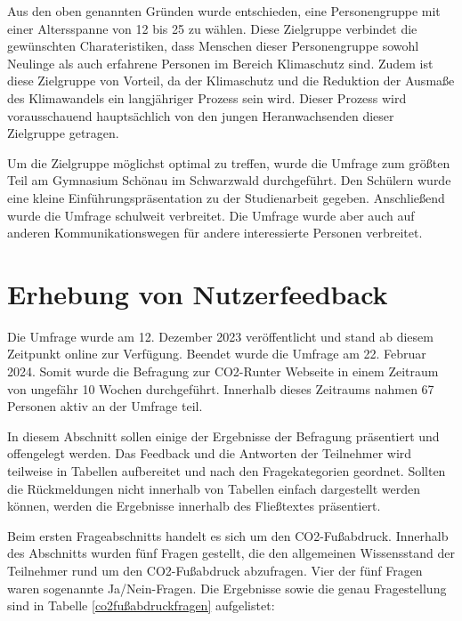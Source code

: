 Aus den oben genannten Gründen wurde entschieden, eine Personengruppe mit einer Altersspanne von 12 bis 25 zu wählen.
Diese Zielgruppe verbindet die gewünschten Charateristiken, dass Menschen dieser Personengruppe sowohl Neulinge als auch erfahrene Personen im Bereich Klimaschutz sind.
Zudem ist diese Zielgruppe von Vorteil, da der Klimaschutz und die Reduktion der Ausmaße des Klimawandels ein langjähriger Prozess sein wird.
Dieser Prozess wird vorausschauend hauptsächlich von den jungen Heranwachsenden dieser Zielgruppe getragen.

Um die Zielgruppe möglichst optimal zu treffen, wurde die Umfrage zum größten Teil am Gymnasium Schönau im Schwarzwald durchgeführt.
Den Schülern wurde eine kleine Einführungspräsentation zu der Studienarbeit gegeben.
Anschließend wurde die Umfrage schulweit verbreitet.
Die Umfrage wurde aber auch auf anderen Kommunikationswegen für andere interessierte Personen verbreitet.

\section{Erhebung von Nutzerfeedback}
Die Umfrage wurde am 12. Dezember 2023 veröffentlicht und stand ab diesem Zeitpunkt online zur Verfügung.
Beendet wurde die Umfrage am 22. Februar 2024.
Somit wurde die Befragung zur CO2-Runter Webseite in einem Zeitraum von ungefähr 10 Wochen durchgeführt.
Innerhalb dieses Zeitraums nahmen 67 Personen aktiv an der Umfrage teil.

In diesem Abschnitt sollen einige der Ergebnisse der Befragung präsentiert und offengelegt werden.
Das Feedback und die Antworten der Teilnehmer wird teilweise in Tabellen aufbereitet und nach den Fragekategorien geordnet.
Sollten die Rückmeldungen nicht innerhalb von Tabellen einfach dargestellt werden können, werden die Ergebnisse innerhalb des Fließtextes präsentiert.

Beim ersten Frageabschnitts handelt es sich um den CO2-Fußabdruck.
Innerhalb des Abschnitts wurden fünf Fragen gestellt, die den allgemeinen Wissensstand der Teilnehmer rund um den CO2-Fußabdruck abzufragen.
Vier der fünf Fragen waren sogenannte Ja/Nein-Fragen.
Die Ergebnisse sowie die genau Fragestellung sind in Tabelle \ref{co2fußabdruckfragen} aufgelistet: \newline

